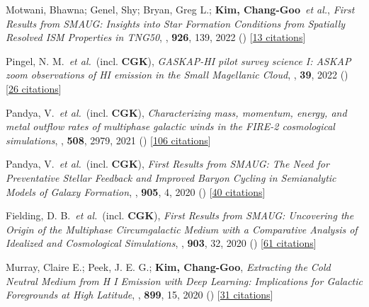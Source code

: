 \item[{9.}]Motwani, Bhawna; Genel, Shy; Bryan, Greg L.; \textbf{Kim, Chang-Goo}~\textit{et al.}, \textit{First Results from SMAUG: Insights into Star Formation Conditions from Spatially Resolved ISM Properties in TNG50}, , \textbf{926}, 139, 2022 () [\href{http://adsabs.harvard.edu/abs/2022ApJ...926..139M}{13 citations}]

\item[{8.}]Pingel, N. M.~\textit{et al.}~(incl. \textbf{CGK}), \textit{GASKAP-HI pilot survey science I: ASKAP zoom observations of HI emission in the Small Magellanic Cloud}, , \textbf{39}, 2022 () [\href{http://adsabs.harvard.edu/abs/2022PASA...39....5P}{26 citations}]

\item[{7.}]Pandya, V.~\textit{et al.}~(incl. \textbf{CGK}), \textit{Characterizing mass, momentum, energy, and metal outflow rates of multiphase galactic winds in the FIRE-2 cosmological simulations}, , \textbf{508}, 2979, 2021 () [\href{http://adsabs.harvard.edu/abs/2021MNRAS.508.2979P}{106 citations}]

\item[{6.}]Pandya, V.~\textit{et al.}~(incl. \textbf{CGK}), \textit{First Results from SMAUG: The Need for Preventative Stellar Feedback and Improved Baryon Cycling in Semianalytic Models of Galaxy Formation}, , \textbf{905}, 4, 2020 () [\href{http://adsabs.harvard.edu/abs/2020ApJ...905....4P}{40 citations}]

\item[{5.}]Fielding, D. B.~\textit{et al.}~(incl. \textbf{CGK}), \textit{First Results from SMAUG: Uncovering the Origin of the Multiphase Circumgalactic Medium with a Comparative Analysis of Idealized and Cosmological Simulations}, , \textbf{903}, 32, 2020 () [\href{http://adsabs.harvard.edu/abs/2020ApJ...903...32F}{61 citations}]

\item[{4.}]Murray, Claire E.; Peek, J. E. G.; \textbf{Kim, Chang-Goo}, \textit{Extracting the Cold Neutral Medium from H I Emission with Deep Learning: Implications for Galactic Foregrounds at High Latitude}, , \textbf{899}, 15, 2020 () [\href{http://adsabs.harvard.edu/abs/2020ApJ...899...15M}{31 citations}]

